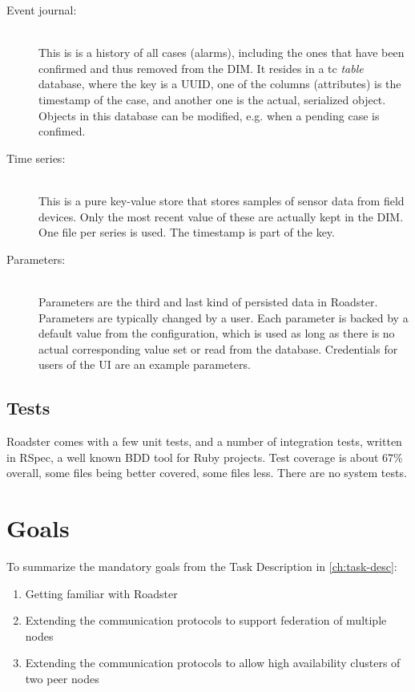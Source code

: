 \begin{description}
	\item [ Event journal: ] \hfill\\
		This is is a history of all cases (alarms), including the ones
		that have been confirmed and thus removed from the DIM. It
		resides in a \gls{tc} \emph{table} database, where the key is a
		\gls{UUID}, one of the columns (attributes) is the timestamp of
		the case, and another one is the actual, serialized 
		object. Objects in this database can be modified, e.g. when a
		pending case is confimed.

	\item [ Time series: ] \hfill\\
		This is a pure key-value store that stores samples of sensor
		data from field devices. Only the most recent value of these
		are actually kept in the DIM. One file per series is used. The
		timestamp is part of the key.

	\item [ Parameters: ] \hfill\\
		Parameters are the third and last kind of persisted data in
		Roadster. Parameters are typically changed by a user. Each
		parameter is backed by a default value from the configuration,
		which is used as long as there is no actual corresponding value
		set or read from the database. Credentials for users of the UI
		are an example parameters.
\end{description}



\subsection{Tests}
Roadster comes with a few unit tests, and a number of integration tests,
written in RSpec, a well known BDD tool for Ruby projects. Test coverage is
about 67\% overall, some files being better covered, some files less. There are
no system tests.

\section{Goals}

To summarize the mandatory goals from the Task Description in \autoref{ch:task-desc}:

\begin{enumerate}
	\item Getting familiar with Roadster
	\item Extending the communication protocols to support federation of
		multiple nodes
	\item Extending the communication protocols to allow high availability
		clusters of two peer nodes
\end{enumerate}

